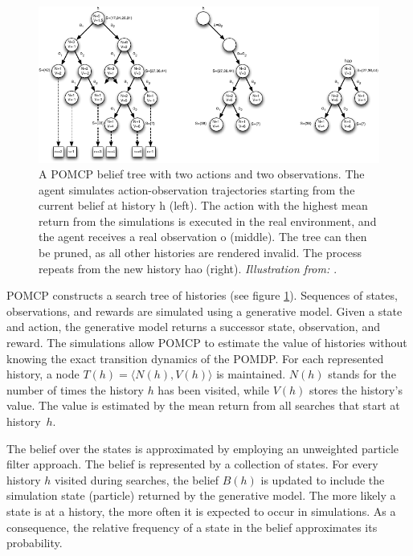 \begin{figure}[htbp]
    \centering
    \includegraphics[width=1.0\textwidth]{figures/POMCP_original.pdf}
    \caption[A POMCP belief tree]{A POMCP belief tree with two actions and two observations. The agent simulates action-observation trajectories starting from the current belief at history h (left). The action with the highest mean return from the simulations is executed in the real environment, and the agent receives a real observation o (middle). The tree can then be pruned, as all other histories are rendered invalid. The process repeats from the new history hao (right). \emph{Illustration from: \cite{pomcp}}.}
    \label{fig:pomcp_original}
\end{figure}


\noindent
POMCP constructs a search tree of histories (see figure \ref{fig:pomcp_original}). Sequences of states, observations, and rewards are simulated using a generative model. Given a state and action, the generative model returns a successor state, observation, and reward. The simulations allow POMCP to estimate the value of histories without knowing the exact transition dynamics of the POMDP. For each represented history, a node $T(h) = \langle N(h), V(h) \rangle$ is maintained. $N(h)$ stands for the number of times the history $h$ has been visited, while $V(h)$ stores the history's value. The value is estimated by the mean return from all searches that start at history~$h$. 

The belief over the states is approximated by employing an unweighted particle filter approach. The belief is represented by a collection of states. For every history $h$ visited during searches, the belief $B(h)$ is updated to include the simulation state (particle) returned by the generative model. The more likely a state is at a history, the more often it is expected to occur in simulations. As a consequence, the relative frequency of a state in the belief approximates its probability.

